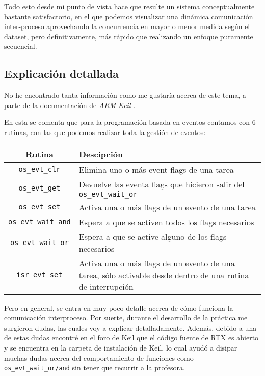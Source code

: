 \documentclass[a4paper,openright,12pt]{article}
\begin{document}
Todo esto desde mi punto de vista hace que resulte un sistema conceptualmente bastante satisfactorio, en el que podemos visualizar una dinámica comunicación inter-proceso aprovechando
la concurrencia en mayor o menor medida según el dataset, pero definitivamente, más rápido que realizando un enfoque puramente secuencial.

\subsection{Explicación detallada}
No he encontrado tanta información como me gustaría acerca de este tema, a parte de la documentación de \emph{ARM
Keil} \autocite[]{keil_function_reference}.

En esta se comenta que para la programación basada en eventos contamos con 6 rutinas, con las que podemos realizar toda la gestión de eventos:
\begin{samepage}
\begin{center}
\begin{tabular}{ | c | >{\centering\arraybackslash}m{11cm} | }
    \hline
    Rutina              &   Descipción\\
    \hline
    \texttt{os\_evt\_clr}        &   Elimina uno o más event flags de una tarea\\
    \hline
    \texttt{os\_evt\_get}        &   Devuelve las eventa flags que hicieron salir del \texttt{os\_evt\_wait\_or}\\
    \hline
    \texttt{os\_evt\_set}        &   Activa una o más flags de un evento de una tarea\\
    \hline
    \texttt{os\_evt\_wait\_and}  &   Espera a que se activen todos los flags necesarios\\
    \hline
    \texttt{os\_evt\_wait\_or}   &   Espera a que se active alguno de los flags necesarios\\
    \hline
    \texttt{isr\_evt\_set}       &   Activa una o más flags de un evento de una tarea, sólo activable desde dentro de una rutina de interrupción\\
    \hline
\end{tabular}
\end{center}
\end{samepage}

Pero en general, se entra en muy poco detalle acerca de cómo funciona la comunicación interproceso. Por suerte, durante el desarrollo de la práctica me surgieron dudas, las cuales
voy a explicar detalladamente. Además, debido a una de estas dudas encontré en el foro de Keil que el código fuente de RTX es abierto y se encuentra en la carpeta de instalación de Keil,
lo cual ayudó a disipar muchas dudas acerca del comportamiento de funciones como \texttt{os\_evt\_wait\_or/and} sin tener que recurrir a la profesora.
\end{document}
